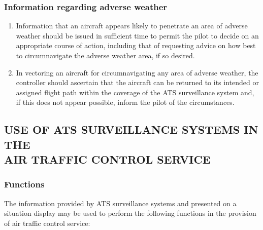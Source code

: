 \subsubsection{Information regarding adverse weather}

\begin{enumerate}
    \item Information that an aircraft appears likely to penetrate an area of adverse weather should be issued in sufficient time to permit the pilot to decide on an appropriate course of action, including that of requesting advice on how best to circumnavigate the adverse weather area, if so desired.
    \item \label{8.6.9.2} In vectoring an aircraft for circumnavigating any area of adverse weather, the controller should ascertain that the aircraft can be returned to its intended or assigned flight path within the coverage of the ATS surveillance system and, if this does not appear possible, inform the pilot of the circumstances.
\end{enumerate}

\subsection[Use of ATS surveillance systems in the air traffic control service]{USE OF ATS SURVEILLANCE SYSTEMS IN THE \\ AIR TRAFFIC CONTROL SERVICE}


\subsubsection{Functions}

The information provided by ATS surveillance systems and presented on a situation display may be used to perform the following functions in the provision of air traffic control service:

